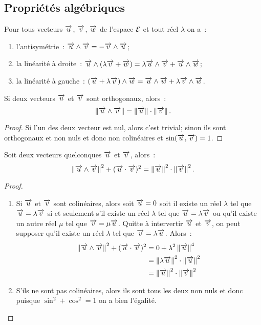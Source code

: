 \subsection{Propriétés algébriques}
\begin{prop}
  Pour tous vecteurs \(\vu\), \(\vv\), \(\vw\) de l'espace \(\E\) et tout réel \(\lambda\) on a~:
  \begin{enumerate}
  \item l'antisymétrie~: \(\vu\wedge\vv=-\vv\wedge\vu\);
  \item la linéarité à droite~: \(\vu\wedge(\lambda\vv+\vw)=\lambda\vu\wedge\vv+\vu\wedge\vw\);
  \item la linéarité à gauche~: \((\vu+\lambda\vv)\wedge\vw=\vu\wedge\vw+\lambda\vv\wedge\vw\).
  \end{enumerate}
\end{prop}
\begin{prop}
  Si deux vecteurs \(\vu\) et \(\vv\) sont orthogonaux, alors~:
\begin{equation}
  \norme{\vu\wedge\vv}=\norme{\vu}\cdot\norme{\vv}.
\end{equation}
\end{prop}
\begin{proof}
  Si l'un des deux vecteur est nul, alors c'est trivial; sinon ils sont orthogonaux et non nuls et donc non colinéaires et \(\sin(\vu,\vv)=1\).
\end{proof}
\begin{prop}
  Soit deux vecteurs quelconques \(\vu\) et \(\vv\), alors~:
  \begin{equation}
    \norme{\vu\wedge\vv}^2+(\vu\cdot\vv)^2=\norme{\vu}^2\cdot\norme{\vv}^2.
  \end{equation}
\end{prop}
\begin{proof}
  \begin{enumerate}
  \item Si \(\vu\) et \(\vv\) sont colinéaires, alors soit \(\vu=0\) soit il existe un réel \(\lambda\) tel que \(\vu=\lambda\vv\) si et seulement s'il existe  un réel \(\lambda\) tel que \(\vu=\lambda\vv\) ou qu'il existe un autre réel \(\mu\) tel que \(\vv=\mu\vu\). Quitte à intervertir \(\vu\) et \(\vv\), on peut supposer qu'il existe un réel \(\lambda\) tel que \(\vv=\lambda\vu\). Alors~:
    \begin{align}
      \norme{\vu\wedge\vv}^2+(\vu\cdot\vv)^2&=0+\lambda^2\norme{\vu}^4\\
      &=\norme{\lambda\vu}^2\cdot\norme{\vu}^2\\
      &=\norme{\vu}^2\cdot\norme{\vv}^2
    \end{align}
  \item S'ils ne sont pas colinéaires, alors ils sont tous les deux non nuls et donc puisque \(\sin^2+\cos^2=1\) on a bien l'égalité.
  \end{enumerate}
\end{proof}
